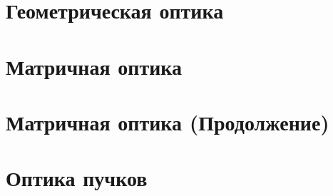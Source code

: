 


\section{Геометрическая оптика}

\newpage 

\section{Матричная оптика}


\section{Матричная оптика (Продолжение)}


\section{Оптика пучков}



